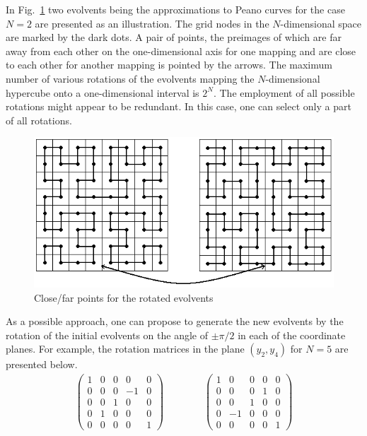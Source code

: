In Fig.~\ref{6_fig_9} two evolvents being the approximations to Peano curves for the case $N=2$ are presented as an illustration. The grid nodes in the $N$-dimensional space are marked by the dark dots. A pair of points, the preimages of which are far away from each other on the one-dimensional axis for one mapping and are close to each other for another mapping is pointed by the arrows. The maximum number of various rotations of the evolvents mapping the $N$-dimensional hypercube onto a one-dimensional interval is $2^N$. The employment of all possible rotations might appear to be redundant. In this case, one can select only a part of all rotations.

\begin{figure}[t]
\includegraphics[width=0.8\linewidth]{figures/6_9.png}
\caption{Close/far points for the rotated evolvents}
\label{6_fig_9}     
\end{figure}

As a possible approach, one can propose to generate the new evolvents by the rotation of the initial evolvents on the angle of $\pm\pi/2$ in each of the coordinate planes. For example, the rotation matrices in the plane $(y_2,y_4)$ for  $N=5$ are presented below.
\begin{eqnarray*} 
 \begin{pmatrix}
  1 & 0 & 0 & 0 & 0 \\
  0 & 0 & 0 & -1 & 0 \\
  0 & 0 & 1 & 0 & 0 \\
  0 & 1 & 0 & 0 & 0 \\
  0 & 0 & 0 & 0 & 1
 \end{pmatrix}
\qquad \qquad
 \begin{pmatrix}
  1 & 0 & 0 & 0 & 0 \\
  0 & 0 & 0 & 1 & 0 \\
  0 & 0 & 1 & 0 & 0 \\
  0 & -1 & 0 & 0 & 0 \\
  0 & 0 & 0 & 0 & 1
 \end{pmatrix}
\end{eqnarray*} 

